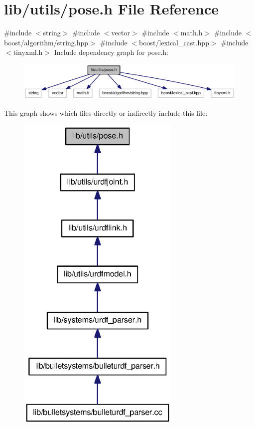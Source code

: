 \section{lib/utils/pose.h \-File \-Reference}
\label{pose_8h}
{\ttfamily \#include $<$string$>$}\*
{\ttfamily \#include $<$vector$>$}\*
{\ttfamily \#include $<$math.\-h$>$}\*
{\ttfamily \#include $<$boost/algorithm/string.\-hpp$>$}\*
{\ttfamily \#include $<$boost/lexical\-\_\-cast.\-hpp$>$}\*
{\ttfamily \#include $<$tinyxml.\-h$>$}\*
\-Include dependency graph for pose.\-h\-:
\nopagebreak
\begin{figure}[H]
\begin{center}
\leavevmode
\includegraphics[width=350pt]{pose_8h__incl}
\end{center}
\end{figure}
\-This graph shows which files directly or indirectly include this file\-:
\nopagebreak
\begin{figure}[H]
\begin{center}
\leavevmode
\includegraphics[width=222pt]{pose_8h__dep__incl}
\end{center}
\end{figure}
